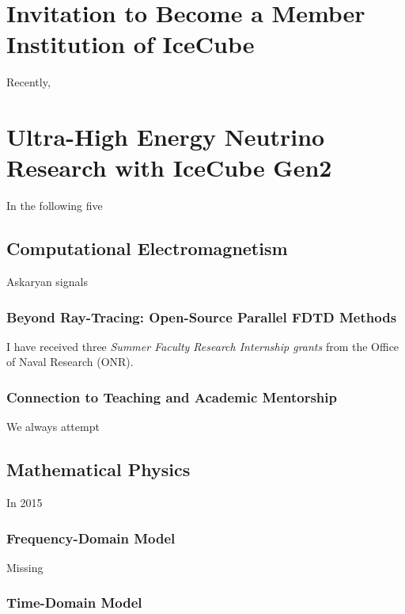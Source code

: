 \documentclass[../../../main.tex]{subfiles}
\begin{document}
\section{Invitation to Become a Member Institution of IceCube}
\label{sec:invite}

Recently, 

\section{Ultra-High Energy Neutrino Research with IceCube Gen2}
\label{sec:neutrino}

In the following five 

\subsection{Computational Electromagnetism}
\label{sec:cem}

Askaryan signals 

\subsubsection{Beyond Ray-Tracing: Open-Source Parallel FDTD Methods}
\label{sec:cem_cluster}

I have received three \textit{Summer Faculty Research Internship grants} from the Office of Naval Research (ONR).

\subsubsection{Connection to Teaching and Academic Mentorship}

We always attempt

\subsection{Mathematical Physics}
\label{sec:math_phys}

In 2015

\subsubsection{Frequency-Domain Model}

Missing

\subsubsection{Time-Domain Model}
\end{document}
